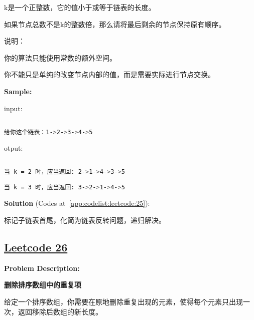 k是一个正整数，它的值小于或等于链表的长度。\par

如果节点总数不是k的整数倍，那么请将最后剩余的节点保持原有顺序。\par

说明：\par

你的算法只能使用常数的额外空间。\par

你不能只是单纯的改变节点内部的值，而是需要实际进行节点交换。\par


\textbf{Sample:}\par

input:\par

\begin{lstlisting}[language=bash]

给你这个链表：1->2->3->4->5


\end{lstlisting}

otput:\par

\begin{lstlisting}[language=bash]

当 k = 2 时，应当返回: 2->1->4->3->5

当 k = 3 时，应当返回: 3->2->1->4->5


\end{lstlisting}

\textbf{Solution }(Codes at~\ref{app:codelist:leetcode:25}):\par

标记子链表首尾，化简为链表反转问题，递归解决。\par



\subsection{\href{https://leetcode-cn.com/}{Leetcode 26}}\label{app:problemlist:leetcode:26}

\textbf{Problem Description:}\par

\textbf{删除排序数组中的重复项}\par

给定一个排序数组，你需要在原地删除重复出现的元素，使得每个元素只出现一次，返回移除后数组的新长度。\par


